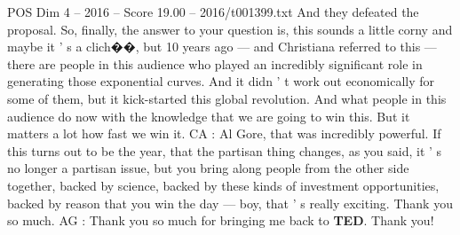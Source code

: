 \begin{textsample}{POS Dim 4 – 2016 – Score 19.00 – 2016/t001399.txt}
And they defeated the proposal.
So, finally, the answer to your question is, this sounds a little corny and maybe it ' s a clich{\EmojiFont �}{\EmojiFont �}, but 10 years ago — and Christiana referred to this — there are people in this audience who played an incredibly significant role in generating those exponential curves.
And it didn ' t work out economically for some of them, but it kick-started this global revolution.
And what people in this audience do now with the knowledge that we are going to win this.
But it matters a lot how fast we win it.
CA : Al Gore, that was incredibly powerful.
If this turns out to be the year, that the partisan thing changes, as you said, it ' s no longer a partisan issue, but you bring along people from the other side together, backed by science, backed by these kinds of investment opportunities, backed by reason that you win the day — boy, that ' s really exciting.
Thank you so much.
AG : Thank you so much for bringing me back to \textbf{TED}.
Thank you!

\end{textsample}
